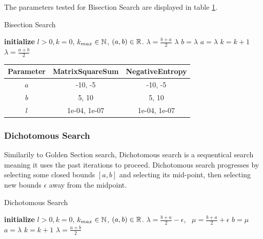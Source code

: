 \documentclass[a4paper,english,titlepage,12pt]{article}
\newcommand{\abs}[1]{\ensuremath|#1|}
\newcommand{\R}{\ensuremath\mathbb{R}}
\newcommand{\N}{\ensuremath\mathbb{N}}
\begin{document}
The parameters tested for Bisection Search are displayed in table \ref{tab:params_BisectionSearch}.

\begin{algorithm}[H]
\caption{Bisection Search}
\label{alg_bisection}
\begin{algorithmic}[1]
\STATE \textbf{initialize} $l > 0, k = 0$, $k_{max} \in \N$, $(a, b) \in \R$.
\WHILE{$\abs{b - a} > l$ \AND $k < k_{max}$}
    \STATE $\lambda = \frac{b + a}{2}$
        \RETURN $\lambda$
        \STATE $b = \lambda$
    \ELSE
        \STATE $a = \lambda$
    \ENDIF
    \STATE $k = k + 1$
\ENDWHILE
\RETURN $\lambda = \frac{a + b}{2}$
\end{algorithmic}
\end{algorithm}

\begin{table}[H]
\label{tab:params_BisectionSearch}
\centering
{}
\begin{tabular}{|c|c|c|}
\hline
\rowcolor{gray!25}
Parameter & MatrixSquareSum & NegativeEntropy \\
\hline
$a$ & -10, -5 & -10, -5 \\
$b$ & 5, 10 & 5, 10 \\
$l$ & 1e-04, 1e-07 & 1e-04, 1e-07 \\
\hline
\end{tabular}
\end{table}


\subsubsection{Dichotomous Search}


Similarily to Golden Section search, Dichotomous search is a sequentical search meaning it uses the past iterations to proceed. Dichotomous search progresses by selecting some closed bounds $[a, b]$ and selecting its mid-point, then selecting new bounds $\epsilon$ away from the midpoint. \cite{book:nonlinear_programming}

\begin{algorithm}[H]
\caption{Dichotomous Search}
\label{alg_dichotomous}
\begin{algorithmic}[1]
\STATE \textbf{initialize} $l > 0, k = 0$, $k_{max} \in \N$, $(a, b) \in \R$.
    \STATE $\lambda = \frac{b + a}{2} - \epsilon$, \ $\mu = \frac{b + a}{2} + \epsilon$
    \IF{$\theta(\lambda) < \theta(\mu)$}
        \STATE $b = \mu$
    \ELSE
        \STATE $a = \lambda$
    \ENDIF
    \STATE $k = k + 1$
\ENDWHILE
\RETURN $\lambda = \frac{a + b}{2}$
\end{algorithmic}
\end{algorithm}
\end{document}
